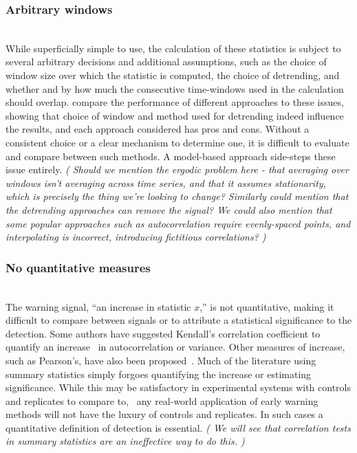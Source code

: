 \documentclass[authoryear,preprint,11pt]{elsarticle}
\newcommand{\cb}[1]{{\it \color{darkgreen} (#1)}}
\begin{document}
\subsubsection*{Arbitrary windows}\\
While superficially simple to use, the calculation of these statistics is subject to 
several arbitrary decisions and additional assumptions,
such as the choice of window size over which the statistic is computed,
the choice of detrending,
and whether and by how much the consecutive time-windows used in the calculation should overlap.  
\citet{Lenton2012} compare the performance of different approaches to these issues,
showing that choice of window and method used for detrending indeed influence the results,
and each approach considered has pros and cons.  
Without a consistent choice or a clear mechanism to determine one, %
it is difficult to evaluate and compare between such methods.  
A model-based approach side-steps these issue entirely.  
\cb{
 Should we mention the ergodic problem here - that averaging over windows isn't averaging across time series, 
 and that it assumes stationarity, which is precisely the thing we're looking to change?  
 Similarly could mention that the detrending approaches can remove the signal?
 We could also mention that some popular approaches such as autocorrelation require evenly-spaced points,
 and interpolating is incorrect, introducing fictitious correlations?
}


\subsubsection*{No quantitative measures}\\
The warning signal, ``an increase in statistic $x$,'' is not quantitative,
making it difficult to compare between signals or to
attribute a statistical significance to the detection.
Some authors have suggested Kendall's correlation coefficient to quantify an increase~\citep{Dakos2008, Dakos20011} 
in autocorrelation or variance.  
Other measures of increase, such as Pearson's, have also been proposed~\citep{Drake2010}.  
Much of the literature using summary statistics simply forgoes quantifying
the increase or estimating significance.  
While this may be satisfactory in experimental systems with controls and replicates to compare to,~\citep[\emph{e.g.}][]{Drake2010, Carpenter2011}
any real-world application of early warning methods will not have the luxury of controls and replicates.
In such cases a quantitative definition of detection is essential.  
\cb{ We will see that correlation tests in summary statistics are an ineffective way to do this.  }
\end{document}
